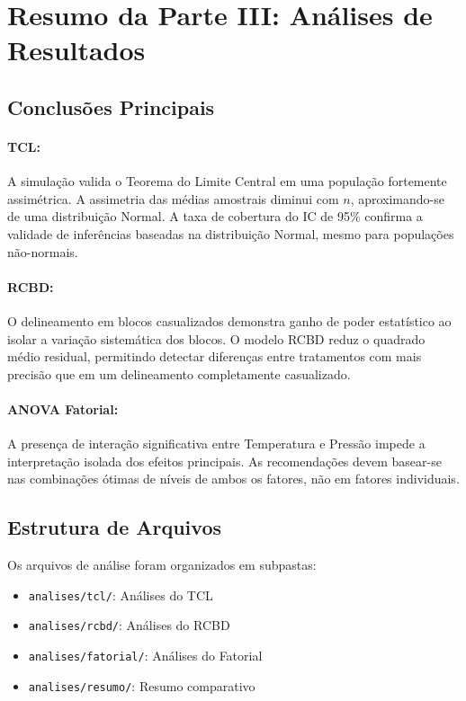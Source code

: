 \documentclass[11pt]{article}
\begin{document}
\section*{Resumo da Parte III: Análises de Resultados}

\subsection*{Conclusões Principais}

\paragraph{TCL:} 
A simulação valida o Teorema do Limite Central em uma população fortemente assimétrica. A assimetria das médias amostrais diminui com $n$, aproximando-se de uma distribuição Normal. A taxa de cobertura do IC de 95\% confirma a validade de inferências baseadas na distribuição Normal, mesmo para populações não-normais.

\paragraph{RCBD:} 
O delineamento em blocos casualizados demonstra ganho de poder estatístico ao isolar a variação sistemática dos blocos. O modelo RCBD reduz o quadrado médio residual, permitindo detectar diferenças entre tratamentos com mais precisão que em um delineamento completamente casualizado.

\paragraph{ANOVA Fatorial:} 
A presença de interação significativa entre Temperatura e Pressão impede a interpretação isolada dos efeitos principais. As recomendações devem basear-se nas combinações ótimas de níveis de ambos os fatores, não em fatores individuais.

\subsection*{Estrutura de Arquivos}
Os arquivos de análise foram organizados em subpastas:
\begin{itemize}
\item \texttt{analises/tcl/}: Análises do TCL
\item \texttt{analises/rcbd/}: Análises do RCBD
\item \texttt{analises/fatorial/}: Análises do Fatorial
\item \texttt{analises/resumo/}: Resumo comparativo
\end{itemize}
\end{document}
